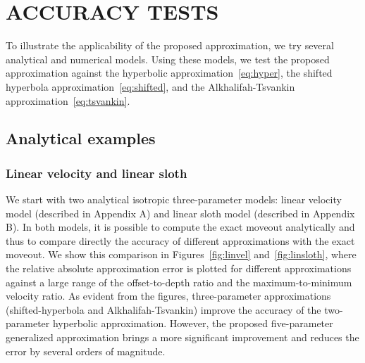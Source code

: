 \section{ACCURACY TESTS}
To illustrate the applicability of the proposed approximation, we try
several analytical and numerical models. Using these models, we test
the proposed approximation against the hyperbolic
approximation~\ref{eq:hyper}, the shifted hyperbola
approximation~\ref{eq:shifted}, and the Alkhalifah-Tsvankin
approximation~\ref{eq:tsvankin}.

\subsection{Analytical examples}

\subsubsection{Linear velocity and linear sloth}

We start with two analytical isotropic three-parameter models: linear
velocity model (described in Appendix A) and linear sloth model
(described in Appendix B). In both models, it is possible to compute
the exact moveout analytically and thus to compare directly the
accuracy of different approximations with the exact moveout. We show
this comparison in Figures~\ref{fig:linvel} and~\ref{fig:linsloth},
where the relative absolute approximation error is plotted for
different approximations against a large range of the offset-to-depth
ratio and the maximum-to-minimum velocity ratio. As evident from the
figures, three-parameter approximations (shifted-hyperbola and
Alkhalifah-Tsvankin) improve the accuracy of the two-parameter
hyperbolic approximation. However, the proposed five-parameter
generalized approximation brings a more significant improvement and
reduces the error by several orders of magnitude.




